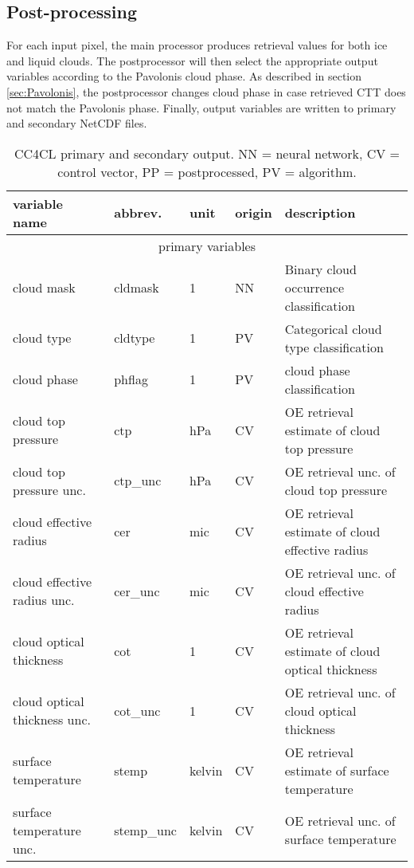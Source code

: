 \subsection{Post-processing}
For each input pixel, the main processor produces retrieval values for both ice and liquid clouds. The postprocessor will then select the appropriate output variables according to the Pavolonis cloud phase. As described in section \ref{sec:Pavolonis}, the postprocessor changes cloud phase in case retrieved CTT does not match the Pavolonis phase. Finally, output variables are written to primary and secondary NetCDF files.

\begin{table*}[h]
  \caption{CC4CL primary and secondary output. NN = neural network, CV = control vector, PP = postprocessed, PV = \citet{Pavolonis05} algorithm.}
  \begin{tabular}{l|l|l|l|l}
    \hline
    variable name & abbrev. & unit & origin & description \\
    \hline
    \multicolumn{5}{c}{primary variables} \\
    \hline
    cloud mask & cldmask & 1 & NN & Binary cloud occurrence classification \\
    cloud type & cldtype & 1 & PV & Categorical cloud type classification \\
    cloud phase & phflag & 1 & PV &  cloud phase classification \\
    cloud top pressure & ctp & hPa & CV & OE retrieval estimate of cloud top pressure \\
    cloud top pressure unc. & ctp\_unc & hPa & CV & OE retrieval unc. of cloud top pressure \\
    cloud effective radius & cer & mic & CV & OE retrieval estimate of cloud effective radius \\
    cloud effective radius unc. & cer\_unc & mic & CV & OE retrieval unc. of cloud effective radius\\
    cloud optical thickness & cot & 1 & CV & OE retrieval estimate of cloud optical thickness \\
    cloud optical thickness unc. & cot\_unc & 1 & CV & OE retrieval unc. of cloud optical thickness \\
    surface temperature & stemp & kelvin & CV & OE retrieval estimate of surface temperature \\
    surface temperature unc. & stemp\_unc & kelvin & CV & OE retrieval unc. of surface temperature\\
    \hline

\end{tabular}
\end{table*}

